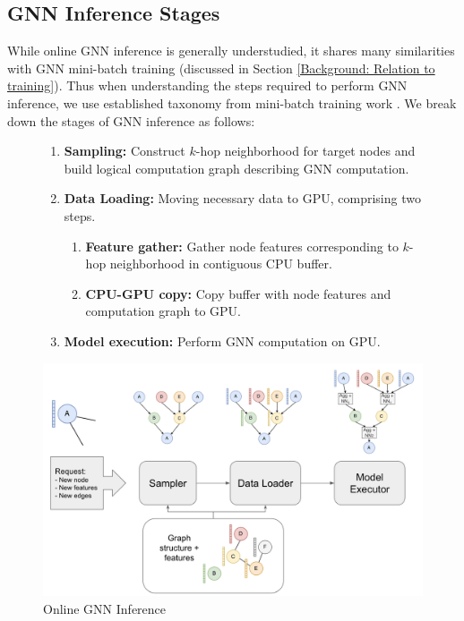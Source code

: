 \subsection{GNN Inference Stages}
While online GNN inference is generally understudied, it shares many similarities with GNN mini-batch training (discussed in Section \ref{Background: Relation to training}). Thus when understanding the steps required to perform GNN inference, we use established taxonomy from mini-batch training work \cite{PaGraph_2020}\cite{GNNLab_2022}\cite{P3_2021}. We break down the stages of GNN inference as follows:

\begin{figure}[h!!!]
    \centering
    \begin{enumerate}
        \item \textbf{Sampling:} Construct $k$-hop neighborhood for target nodes and build logical computation graph describing GNN computation.
        \item \textbf{Data Loading:} Moving necessary data to GPU, comprising two steps.
        \begin{enumerate}
            \item \textbf{Feature gather:} Gather node features corresponding to $k$-hop neighborhood in contiguous CPU buffer.
            \item \textbf{CPU-GPU copy:} Copy buffer with node features and computation graph to GPU.
        \end{enumerate}
        \item \textbf{Model execution:} Perform GNN computation on GPU.
    \end{enumerate}
    \includegraphics[width=\textwidth]{figures/Compute example.png}
    
    \caption{Online GNN Inference}
    \label{Compute Visualization}
\end{figure}    


